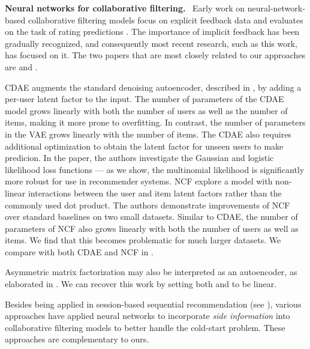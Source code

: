 \documentclass[sigconf]{acmart}
\DeclareRobustCommand{\parhead}[1]{\textbf{#1}~}
\begin{document}
\parhead{Neural networks for collaborative filtering.} 
Early work on neural-network-based collaborative filtering models focus on explicit 
feedback data and evaluates on the task of 
rating predictions \citep{salakhutdinov2007restricted,pmlr-v28-georgiev13,sedhain2015autorec,pmlr-v48-zheng16}. 
The importance of implicit feedback has been gradually recognized, and consequently most recent research, such as this work, has focused on it. 
The two papers that are most closely related 
to our approaches are  \citep{wu2016collaborative} and  \citep{he2017neural}. 

\Gls{CDAE} \citep{wu2016collaborative} augments the standard denoising autoencoder, described in , by adding a 
per-user latent factor to the input. The number of parameters of the \gls{CDAE} model grows linearly with both 
the number of users as well as the number of items, making it more prone to overfitting.
In contrast, the number of parameters in the \gls{VAE} grows linearly with the number of items. The \gls{CDAE} also requires additional optimization to obtain the latent factor for unseen users to make predicion. 
In the paper, the authors investigate the Gaussian and logistic likelihood 
loss functions --- as we show, the multinomial likelihood is significantly more robust for use in recommender systems. 
\Gls{NCF} \citep{he2017neural} explore a model with non-linear interactions between the user and item latent 
factors rather than the commonly used dot product. The authors demonstrate improvements of \gls{NCF} over standard 
baselines on two small datasets. Similar to \gls{CDAE}, the number of parameters of \gls{NCF} 
also grows linearly with both the number of users as well as items. We find that this becomes problematic for much 
larger datasets. We compare with both \gls{CDAE} and \gls{NCF} in .

Asymmetric matrix factorization \citep{paterek2007improving} may also be interpreted as an autoencoder, as 
elaborated in \citet{steck2015gaussian}. We can recover this work by setting both  and  to be linear.

Besides being applied in session-based sequential recommendation (see ),
various approaches \citep{NIPS2013_5004,liang2015content,almahairi2015learning,wang2015collaborative} have applied neural networks 
to incorporate \emph{side information} into collaborative filtering models to better handle the cold-start problem.
These approaches are complementary to ours.
 
\end{document}
